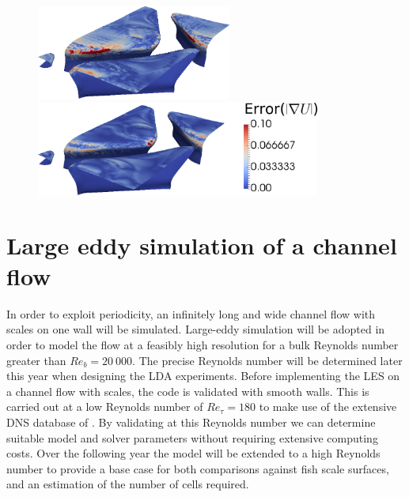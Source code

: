 \documentclass[12pt,oneside,a4paper]{article}
\begin{document}
\begin{figure}
\centering
\includegraphics[height=3.1cm]{images/CFD_meshIndependence/tc3_gradU.png}\hfill \includegraphics[height=3.1cm]{images/CFD_meshIndependence/tc5_gradU_bar.png}\\
\end{figure}

\newpage
\section{Large eddy simulation of a channel flow}
\label{section:les}
In order to exploit periodicity, an infinitely long and wide channel flow with scales on one wall will be simulated. Large-eddy simulation will be adopted in order to model the flow at a feasibly high resolution for a bulk Reynolds number greater than $Re_b = 20\ 000$. The precise Reynolds number will be determined later this year when designing the LDA experiments. Before implementing the LES on a channel flow with scales, the code is validated with smooth walls. This is carried out at a low Reynolds number of $Re_\tau = 180$ to make use of the extensive DNS database of \cite{vreman2014}. By validating at this Reynolds number we can determine suitable model and solver parameters without requiring extensive computing costs. Over the following year the model will be extended to a high Reynolds number to provide a base case for both comparisons against fish scale surfaces, and an estimation of the number of cells required.
\end{document}
